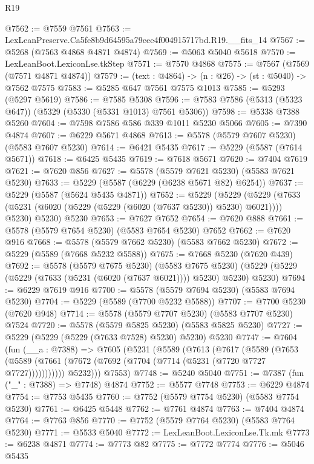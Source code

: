 \begin{lexlean}{R19}
\begin{coremodule}
@7562 := @7559 @7561
@7563 := LexLeanPreserve.Ca5fe8b9d64595a79eee4f004915717bd.R19.__fits_14
@7567 := @5268 (@7563 @4868 @4871 @4874)
@7569 := @5063 @5040 @5618
@7570 := LexLeanBoot.LexiconLse.tkStep
@7571 := @7570 @4868
@7575 := @7567 (@7569 (@7571 @4871 @4874))
@7579 := (text : @4864) -> (n : @26) -> (st : @5040) -> @7562 @7575
@7583 := @5285 @647 @7561 @7575 @1013
@7585 := @5293 (@5297 @5619)
@7586 := @7585 @5308
@7596 := @7583 @7586 (@5313 (@5323 @647)) (@5329 (@5330 (@5331 @1013) @7561 @5306))
@7598 := @5338 @7388 @5260
@7604 := @7598 @7586 @586 @339 @1011 @5230 @5066
@7605 := @7390 @4874
@7607 := @6229 @5671 @4868
@7613 := @5578 (@5579 @7607 @5230) (@5583 @7607 @5230)
@7614 := @6421 @5435
@7617 := @5229 (@5587 (@7614 @5671))
@7618 := @6425 @5435
@7619 := @7618 @5671
@7620 := @7404 @7619
@7621 := @7620 @856
@7627 := @5578 (@5579 @7621 @5230) (@5583 @7621 @5230)
@7633 := @5229 (@5587 (@6229 (@6238 @5671 @82) @6254))
@7637 := @5229 (@5587 (@5624 @5435 @4871))
@7652 := @5229
    (@5229
      (@5229 (@7633 (@5231 (@6020 (@5229 (@5229 (@6020 (@7637 @5230)) @5230) @6021)))) @5230)
      @5230)
    @5230
@7653 := @7627 @7652
@7654 := @7620 @888
@7661 := @5578 (@5579 @7654 @5230) (@5583 @7654 @5230) @7652
@7662 := @7620 @916
@7668 := @5578 (@5579 @7662 @5230) (@5583 @7662 @5230)
@7672 := @5229 (@5589 (@7668 @5232 @5588))
@7675 := @7668 @5230 (@7620 @439)
@7692 := @5578
    (@5579 @7675 @5230)
    (@5583 @7675 @5230)
    (@5229 (@5229 (@5229 (@7633 (@5231 (@6020 (@7637 @6021)))) @5230) @5230) @5230)
@7694 := @6229 @7619 @916
@7700 := @5578 (@5579 @7694 @5230) (@5583 @7694 @5230)
@7704 := @5229 (@5589 (@7700 @5232 @5588))
@7707 := @7700 @5230 (@7620 @948)
@7714 := @5578 (@5579 @7707 @5230) (@5583 @7707 @5230) @7524
@7720 := @5578 (@5579 @5825 @5230) (@5583 @5825 @5230)
@7727 := @5229 (@5229 (@5229 (@7633 @7528) @5230) @5230) @5230
@7747 := @7604
    (fun (__a : @7388) =>
    @7605
      (@5231
        (@5589
          (@7613
            (@7617
              (@5589
                (@7653
                  (@5589 (@7661 (@7672 (@7692 (@7704 (@7714 (@5231 (@7720 @7727 @7727)))))))))))
            @5232)))
      @7553)
@7748 := @5240 @5040
@7751 := @7387 (fun ("_" : @7388) => @7748) @4874
@7752 := @5577 @7748
@7753 := @6229 @4874
@7754 := @7753 @5435
@7760 := @7752 (@5579 @7754 @5230) (@5583 @7754 @5230)
@7761 := @6425 @5448
@7762 := @7761 @4874
@7763 := @7404 @4874
@7764 := @7763 @856
@7770 := @7752 (@5579 @7764 @5230) (@5583 @7764 @5230)
@7771 := @5533 @5040
@7772 := LexLeanBoot.LexiconLse.Tk.mk
@7773 := @6238 @4871
@7774 := @7773 @82
@7775 := @7772 @7774
@7776 := @5046 @5435

\end{coremodule}
\end{lexlean}
